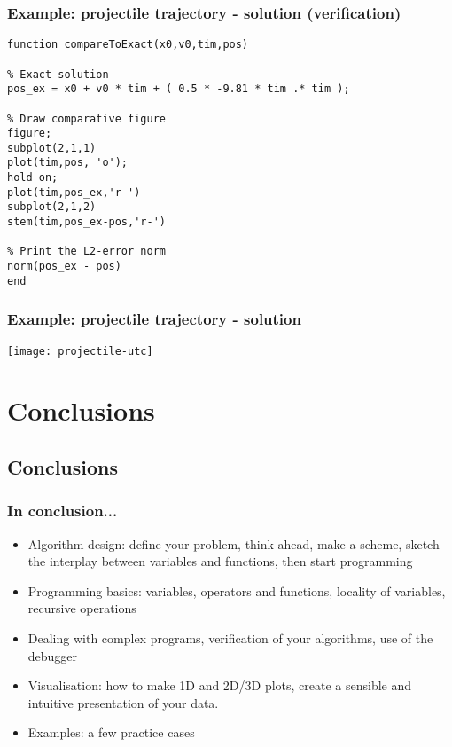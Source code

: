 \documentclass[11pt,table,final,fleqn,xcolor={usenames,dvipsnames}]{beamer}
\begin{document}
\begin{frame}[fragile]
  \frametitle{Example: projectile trajectory - solution (verification)}
  \scriptsize\selectfont
  \begin{lstlisting}
function compareToExact(x0,v0,tim,pos)

% Exact solution
pos_ex = x0 + v0 * tim + ( 0.5 * -9.81 * tim .* tim );

% Draw comparative figure
figure;
subplot(2,1,1)
plot(tim,pos, 'o');
hold on;
plot(tim,pos_ex,'r-')
subplot(2,1,2)
stem(tim,pos_ex-pos,'r-')

% Print the L2-error norm
norm(pos_ex - pos)
end
  \end{lstlisting}
\end{frame}

\begin{frame}
  \frametitle{Example: projectile trajectory - solution}
  \begin{center}
    \texttt{[image: projectile-utc]}
  \end{center}
\end{frame}

\section{Conclusions}
\subsection*{Conclusions}
\begin{frame}[fragile]
  \frametitle{In conclusion...}
  \begin{itemize}
     \item Algorithm design: define your problem, think ahead, make a scheme, sketch the interplay between variables and functions, then start programming
     \item Programming basics: variables, operators and functions, locality of variables, recursive operations
     \item Dealing with complex programs, verification of your algorithms, use of the debugger
     \item Visualisation: how to make 1D and 2D/3D plots, create a sensible and intuitive presentation of your data.
     \item Examples: a few practice cases
  \end{itemize}
\end{frame}
\end{document}
